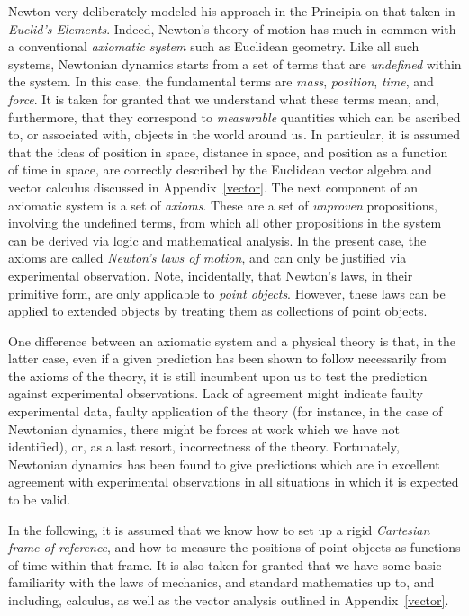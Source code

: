  Newton very deliberately modeled his approach in the Principia on
that taken in {\em Euclid's Elements}.
Indeed, Newton's theory of motion has much in common with a conventional {\em axiomatic system}\/ such  as Euclidean geometry. Like all such  systems, Newtonian dynamics starts from a set of terms that are {\em undefined}\/ within the
system. In  this case, the fundamental terms are {\em mass}, {\em position}, 
{\em time}, and {\em force}. It is taken for granted that  we understand what these terms mean,
and, furthermore, that they correspond to {\em measurable}\/ quantities which
can be ascribed to, or associated with, objects in the world
around us. In particular, it is assumed that the ideas of position
in space, distance in space, and position as a function of time in space, are
correctly described by the Euclidean vector algebra and vector calculus discussed in Appendix~\ref{vector}.
The next component
of an axiomatic system is a set of {\em axioms}. These are a set of
{\em unproven}\/ propositions, involving the undefined terms, from which
all other propositions in the system can be derived via logic and mathematical
analysis. In the present case, the axioms are called {\em Newton's laws of
motion}, and can only be justified via experimental observation.
Note, incidentally, that Newton's laws, in their primitive form, are only applicable
to {\em point objects}. However, these laws can
be applied to extended objects by treating them as collections of point
objects.

One difference between an axiomatic system and a physical theory is that,
in the latter case, even if a given prediction has been shown to follow
necessarily from the axioms of the theory, it is still incumbent upon us to test the prediction against
experimental observations. Lack of agreement might indicate
faulty experimental data, faulty application of the theory (for instance, in the case of Newtonian dynamics, there
might be forces at work which we have not identified), or, as a last resort, 
incorrectness of the theory. Fortunately, 
Newtonian dynamics has been found to give predictions which are in excellent agreement with experimental
observations in all
situations in which  it is expected to be valid.

In the following, it is assumed that we know how to set up a rigid {\em Cartesian
frame of reference}, and how to measure the positions of point objects as 
functions of time within that frame. It is also taken for granted that we  have some basic
familiarity with the laws of mechanics, and standard mathematics up to, and including, calculus, as well
as
the vector analysis outlined in Appendix~\ref{vector}.

